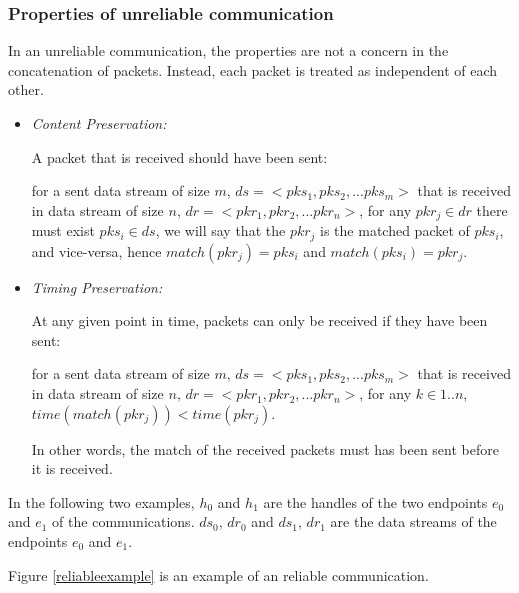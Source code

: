 \subsubsection{Properties of unreliable communication}\label{unreliablepro}
In an unreliable communication, the properties are not a concern in the concatenation of packets. Instead, each packet is treated as independent of each other.
\begin{itemize}
 \item \textit{ Content Preservation:} 

A packet that is received should have been sent:

for a sent data stream of size $m$, $ds= <pks_1, pks_2, ... pks_m>$ that is received in data stream of size $n$, $dr = <pkr_1, pkr_2, ... pkr_n>$,  for any $pkr_j \in dr$ there must exist $pks_i \in ds$, we will say that the $pkr_j$ is the matched packet of $pks_i$, and vice-versa,  hence $match(pkr_j) = pks_i$  and $match(pks_i) = pkr_j$.

 \item \textit{Timing Preservation:}  
 
At any given point in time, packets can only be received if they have been sent:

for a sent data stream of size $m$, $ds= <pks_1, pks_2, ... pks_m>$ that is received in data stream of size $n$, $dr = <pkr_1, pkr_2, ... pkr_n>$, for any $k \in {1..n}$, $time(match(pkr_j)) < time(pkr_j)$.

In other words, the match of the received packets must has been sent before it is received.
\end{itemize}


In the following two examples, $h_0$ and $h_1$ are the handles of the two endpoints $e_0$ and $e_1$ of the communications. $ds_0$, $dr_0$ and $ds_1$, $dr_1$ are the data streams of the endpoints $e_0$ and $e_1$. 

Figure \ref{reliableexample} is an example of an reliable communication. 

